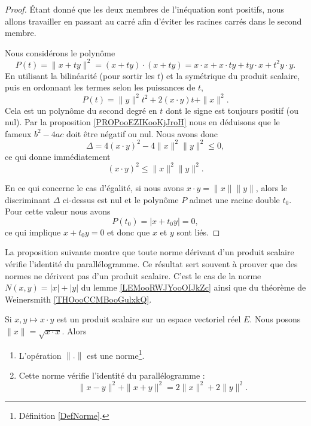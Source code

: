 \begin{proof}
	Étant donné que les deux membres de l'inéquation sont positifs, nous allons travailler en passant au carré afin d'éviter les racines carrés dans le second membre.

	Nous considérons le polynôme
	\begin{equation}
		P(t)=\| x+ty \|^2=(x+ty)\cdot(x+ty)=x\cdot x+x\cdot ty+ty\cdot x+t^2y\cdot y.
	\end{equation}
    En utilisant la bilinéarité (pour sortir les \( t\)) et la symétrique du produit scalaire, puis en ordonnant les termes selon les puissances de $t$,
	\begin{equation}
		P(t)=\| y \|^2t^2+2(x\cdot y)t+\| x \|^2.
	\end{equation}
    Cela est un polynôme du second degré en $t$ dont le signe est toujours positif (ou nul). Par la proposition \ref{PROPooEZIKooKjJroH} nous en déduisons que le fameux \( b^2-4ac\) doit être négatif ou nul. Nous avons donc
	\begin{equation}
		\Delta=4(x\cdot y)^2-4\| x \|^2\| y \|^2\leq 0,
	\end{equation}
	ce qui donne immédiatement
	\begin{equation}
		(x\cdot y)^2\leq\| x \|^2\| y \|^2.
	\end{equation}

    En ce qui concerne le cas d'égalité, si nous avons \( x\cdot y=\| x \|\| y \|\), alors le discriminant \( \Delta\) ci-dessus est nul et le polynôme \( P\) admet une racine double \( t_0\). Pour cette valeur nous avons
    \begin{equation}
        P(t_0)=| x+t_0y |=0,
    \end{equation}
    ce qui implique \( x+t_0y=0\) et donc que \( x\) et \( y\) sont liés.
\end{proof}

La proposition suivante montre que toute norme dérivant d'un produit scalaire vérifie l'identité du parallélogramme. Ce résultat sert souvent à prouver que des normes ne dérivent pas d'un produit scalaire. C'est le cas de la norme \( N(x,y)=| x |+| y |\) du lemme \ref{LEMooRWJYooOIJkZc} ainsi que du théorème de Weinersmith \ref{THOooCCMBooGulxkQ}.
\begin{proposition} \label{PropEQRooQXazLz}
    Si \( x,y\mapsto x\cdot y\) est un produit scalaire sur un espace vectoriel réel \( E\). Nous posons \( \| x \|=\sqrt{x\cdot x}\). Alors
    \begin{enumerate}
        \item
            L'opération \( \| . \|\) est une norme\footnote{Définition \ref{DefNorme}.}.
        \item
            Cette norme vérifie l'identité du parallélogramme :
            \begin{equation}        \label{EqYCLtWfJ}
                \| x-y \|^2+\| x+y \|^2=2\| x \|^2+2\| y \|^2.
            \end{equation}
    \end{enumerate}
\end{proposition}

